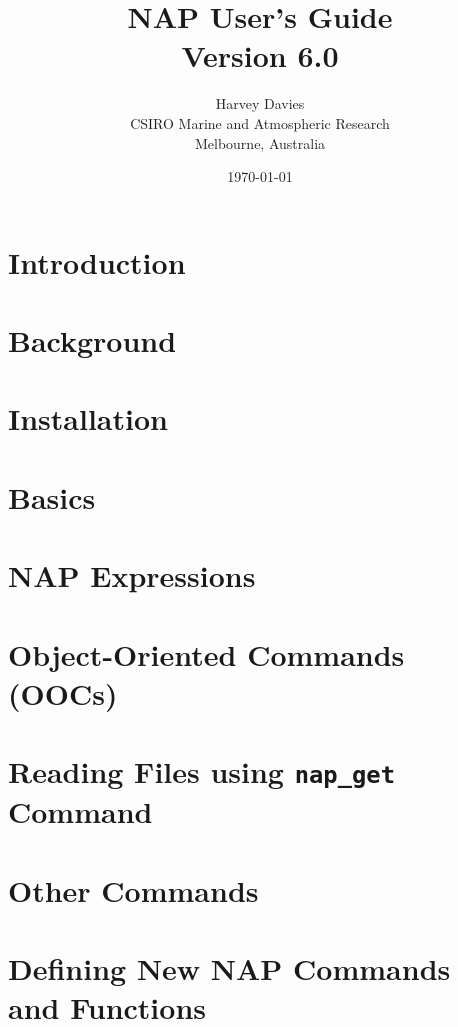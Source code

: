 \documentclass[a4paper]{book}
\title{NAP User's Guide\\Version 6.0}
\author{Harvey Davies\\CSIRO Marine and Atmospheric Research\\Melbourne, Australia}
\date{\today}
\begin{document}
\maketitle
\tableofcontents

\chapter{Introduction}
    
    
    
\chapter{Background}
    
    
    
    
    
\chapter{Installation}
    
    
\chapter{Basics}
    
    
    
    
    
\chapter{NAP Expressions}
    
    
    
    
    
\chapter{Object-Oriented Commands (OOCs)}
    
    
    
    
    
\chapter{Reading Files using \texttt{nap\_get} Command}
    
\chapter{Other Commands}
    
    
\chapter{Defining New NAP Commands and Functions}
    
    
\end{document}
